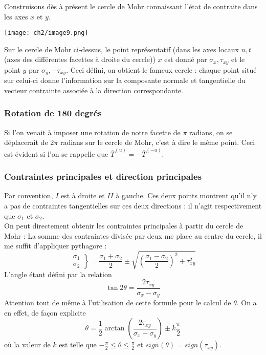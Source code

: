     Construisons dès à présent le cercle de Mohr connaissant l'état de contraite dans les axes $x$ et $y$.
    \begin{center}
    \texttt{[image: ch2/image9.png]}
    \end{center}   
    Sur le cercle de Mohr ci-dessus, le point représentatif (dans les axes locaux $n,t$ (axes des différentes
    facettes à droite du cercle)) $x$ est donné par $\sigma_x, \tau_{xy}$ et le point $y$ par $\sigma_y, 
    -\tau_{xy}$. Ceci défini, on obtient le fameux cercle : chaque point situé sur celui-ci donne l'information
    sur la composante normale et tangentielle du vecteur contrainte associée à la direction correspondante.\\
    
    \subsubsection{Rotation de 180 degrés}
    Si l'on venait à imposer une rotation de notre facette de $\pi$ radians, on se déplacerait de $2\pi$ radians sur le cercle
    de Mohr, c'est à dire le même point. Ceci est évident si l'on se rappelle que $\overline{T}^{(u)} =
    -\overline{T}^{(-u)}$.
    
    \subsubsection{Contraintes principales et direction principales}
    Par convention, $I$ est à droite et $II$ à gauche. Ces deux points montrent qu'il n'y a pas de contraintes
    tangentielles sur ces deux directions : il n'agit respectivement que $\sigma_1$ et $\sigma_2$.\\
    On peut directement obtenir les contraintes principales à partir du cercle de Mohr : La somme des 
    contraintes divisée par deux me place au centre du cercle, il me suffit d'appliquer pythagore :
    \begin{equation}
    \left.\begin{array}{c}
    \sigma_1\\
    \sigma_2
    \end{array}\right\} = \dfrac{\sigma_1+\sigma_2}{2}\pm \sqrt{\left(\dfrac{\sigma_1-\sigma_2}{2}\right)^2
    + \tau_{xy}^2}
    \end{equation}
    L'angle étant défini par la relation 
    \begin{equation}
    \tan 2\theta = \dfrac{2\tau_{xy}}{\sigma_x-\sigma_y}
    \end{equation}
    Attention tout de même à l'utilisation de cette formule pour le calcul de $\theta$. On a en effet, de 
    façon explicite
    \begin{equation}
    \theta = \frac{1}{2}\arctan\left(\dfrac{2\tau_{xy}}{\sigma_x-\sigma_y}\right) \pm k\dfrac{\pi}{2}
    \end{equation}
    où la valeur de $k$ est telle que $-\frac{\pi}{2} \leq \theta \leq \frac{\pi}{2}$ et $sign(\theta) =
    sign(\tau_{xy})$.
    
